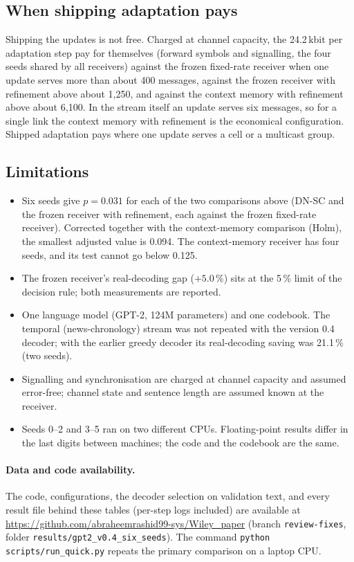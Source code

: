 \subsection{When shipping adaptation pays}
\label{sec:results-crossover}

Shipping the updates is not free. Charged at channel capacity, the 24.2\,kbit
per adaptation step pay for themselves (forward symbols and signalling, the
four seeds shared by all receivers) against the frozen fixed-rate receiver
when one update serves more than about 400 messages, against the frozen
receiver with refinement above about 1{,}250, and against the context memory
with refinement above about 6{,}100. In the stream itself an update serves six
messages, so for a single link the context memory with refinement is the
economical configuration. Shipped adaptation pays where one update serves a
cell or a multicast group.

\subsection{Limitations}
\label{sec:results-limitations}

\begin{itemize}
\item Six seeds give $p = 0.031$ for each of the two comparisons above
  (DN-SC and the frozen receiver with refinement, each against the frozen
  fixed-rate receiver). Corrected together with the context-memory comparison
  (Holm), the smallest adjusted value is 0.094. The context-memory receiver
  has four seeds, and its test cannot go below 0.125.
\item The frozen receiver's real-decoding gap ($+5.0$\,\%) sits at the 5\,\%
  limit of the decision rule; both measurements are reported.
\item One language model (GPT-2, 124M parameters) and one codebook. The
  temporal (news-chronology) stream was not repeated with the version 0.4
  decoder; with the earlier greedy decoder its real-decoding saving was
  21.1\,\% (two seeds).
\item Signalling and synchronisation are charged at channel capacity and
  assumed error-free; channel state and sentence length are assumed known at
  the receiver.
\item Seeds 0--2 and 3--5 ran on two different CPUs. Floating-point results
  differ in the last digits between machines; the code and the codebook are
  the same.
\end{itemize}

{\sloppy
\paragraph*{Data and code availability.}
The code, configurations, the decoder selection on validation text, and every
result file behind these tables (per-step logs included) are available at
\url{https://github.com/abraheemrashid99-sys/Wiley_paper} (branch
\texttt{review-fixes}, folder \texttt{results/gpt2\_v0.4\_six\_seeds}). The
command \texttt{python scripts/run\_quick.py} repeats the primary comparison on
a laptop CPU.\par}
